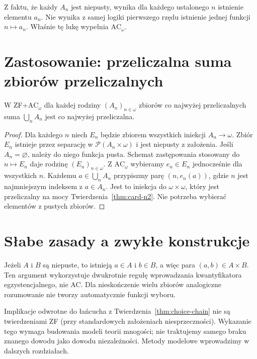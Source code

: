 \begin{uwaga}
Z faktu, że każdy $A_n$ jest niepusty, wynika dla każdego ustalonego $n$ istnienie elementu $a_n$. Nie wynika z samej logiki pierwszego rzędu istnienie jednej funkcji $n\mapsto a_n$. Właśnie tę lukę wypełnia $\mathrm{AC}_{\omega}$.
\end{uwaga}
\section{Zastosowanie: przeliczalna suma zbiorów przeliczalnych}
\begin{twierdzenie}\label{thm:countable-union-cc}
W ZF+$\mathrm{AC}_{\omega}$ dla każdej rodziny $(A_n)_{n\in\omega}$ zbiorów co najwyżej przeliczalnych suma $\bigcup_n A_n$ jest co najwyżej przeliczalna.
\end{twierdzenie}
\begin{proof}
Dla każdego $n$ niech $E_n$ będzie zbiorem
wszystkich iniekcji $A_n\to\omega$.
Zbiór $E_n$ istnieje przez separację
w $\mathcal P(A_n\times\omega)$
i jest niepusty z założenia.
Jeśli $A_n=\varnothing$, należy do niego
funkcja pusta. Schemat zastępowania stosowany
do $n\mapsto E_n$ daje rodzinę
$(E_n)_{n\in\omega}$.
Z $\mathrm{AC}_{\omega}$ wybieramy
$e_n\in E_n$ jednocześnie dla wszystkich $n$.
Każdemu $a\in\bigcup_n A_n$
przypiszmy parę $(n,e_n(a))$, gdzie $n$ jest najmniejszym indeksem z $a\in A_n$. Jest to iniekcja do $\omega\times\omega$, który jest przeliczalny na mocy Twierdzenia~\ref{thm:card-n2}. Nie potrzeba wybierać elementów z pustych zbiorów.
\end{proof}
\section{Słabe zasady a zwykłe konstrukcje}
\begin{przyklad}
Jeżeli $A$ i $B$ są niepuste, to istnieją $a\in A$ i $b\in B$, a więc para $(a,b)\in A\times B$. Ten argument wykorzystuje dwukrotnie regułę wprowadzania kwantyfikatora egzystencjalnego, nie AC. Dla nieskończenie wielu zbiorów analogiczne rozumowanie nie tworzy automatycznie funkcji wyboru.
\end{przyklad}
\begin{uwaga}
Implikacje odwrotne do łańcucha z Twierdzenia~\ref{thm:choice-chain} nie są twierdzeniami ZF (przy standardowych założeniach niesprzeczności). Wykazanie tego wymaga budowania modeli teorii mnogości; nie traktujemy samego braku znanego dowodu jako dowodu niezależności. Metody modelowe wprowadzimy w dalszych rozdziałach.
\end{uwaga}

